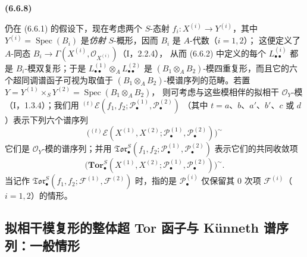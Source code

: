 \documentclass[UTF8,fontset=none,11pt,oneside,openany]{ctexbook}
\newenvironment{env}[1][]{%
  \par\medskip\noindent\textbf{(#1)}\ %
}{\par}
\begin{document}
\begin{env}[6.6.8]
仍在 (6.6.1) 的假设下，现在考虑两个 $S$-态射 $f_i:X^{(i)}\to Y^{(i)}$，其中
$Y^{(i)}=\operatorname{Spec}(B_i)$ 是\emph{仿射} $S$-概形，因而 $B_i$ 是 $A$-代数（$i=1,2$）；
这便定义了 $A$-同态 $B_i\to\Gamma(X^{(i)},\mathscr O_{X^{(i)}})$（I，2.2.4），
从而 (6.6.2) 中定义的每个 $L_{\bullet\bullet}^{(i)}$ 都是 $B_i$-模双复形；于是
$L_{\bullet\bullet}^{(1)}\otimes_A L_{\bullet\bullet}^{(2)}$ 是
$(B_1\otimes_A B_2)$-模四重复形，而且它的六个超同调谱函子可视为取值于
$(B_1\otimes_A B_2)$-模谱序列的范畴。若置
$Y=Y^{(1)}\times_S Y^{(2)}=\operatorname{Spec}(B_1\otimes_A B_2)$，
则可考虑与这些模相伴的拟相干 $\mathscr O_Y$-模（I，1.3.4）；我们用
${}^{(t)}\mathscr E
(f_1,f_2;\mathscr P_\bullet^{(1)},\mathscr P_\bullet^{(2)})$
（其中 $t=a$、$b$、$a'$、$b'$、$c$ 或 $d$）表示下列六个谱序列
\[
  \bigl({}^{(t)}\mathscr E
  (X^{(1)},X^{(2)};
   \mathscr P_\bullet^{(1)},\mathscr P_\bullet^{(2)})\bigr)^{\sim}
\]
它们是 $\mathscr O_Y$-模的谱序列；并用
$\mathfrak{Tor}_\bullet^S
(f_1,f_2;\mathscr P_\bullet^{(1)},\mathscr P_\bullet^{(2)})$ 表示它们的共同收敛项
\[
  \bigl(\mathbf{Tor}_\bullet^S
  (X^{(1)},X^{(2)};
   \mathscr P_\bullet^{(1)},\mathscr P_\bullet^{(2)})\bigr)^{\sim}.
\]
当记作
$\mathfrak{Tor}_\bullet^S(f_1,f_2;\mathscr F^{(1)},\mathscr F^{(2)})$
时，指的是 $\mathscr P_\bullet^{(i)}$ 仅保留其 0 次项 $\mathscr F^{(i)}$（$i=1,2$）的情形。
\end{env}

\subsection{拟相干模复形的整体超 Tor 函子与 Künneth 谱序列：一般情形}
\end{document}
